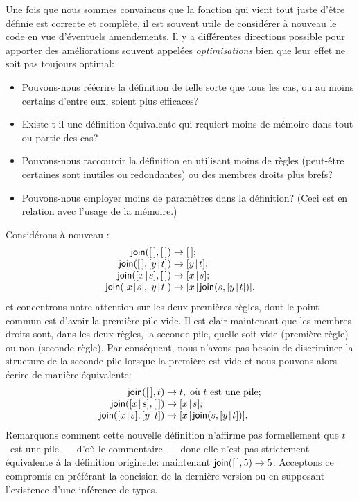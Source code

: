 Une fois que nous sommes convaincus que la fonction qui vient tout
juste d'être définie est correcte et complète, il est souvent utile de
considérer à nouveau le code en vue d'éventuels amendements. Il y a
différentes directions possible pour apporter des améliorations
souvent appelées \emph{optimisations} bien que leur effet ne soit pas
toujours optimal:
\begin{itemize}

\item Pouvons-nous réécrire la définition de telle sorte que tous les
  cas, ou au moins certains d'entre eux, soient plus efficaces?

\item Existe-t-il une définition équivalente qui requiert moins de
  mémoire dans tout ou partie des cas?

\item Pouvons-nous raccourcir la définition en utilisant moins de
  règles (peut-être certaines sont inutiles ou redondantes) ou des
  membres droits plus brefs?

\item Pouvons-nous employer moins de paramètres dans la définition?
  (Ceci est en relation avec l'usage de la mémoire.)

\end{itemize}
Considérons à nouveau :
\begin{equation*}
\begin{array}{r@{\;}l@{\;}l}
\fun{join}(\el,\el) & \rightarrow & \el;\\
\fun{join}(\el,\cons{y}{t}) & \rightarrow & \cons{y}{t};\\
\fun{join}(\cons{x}{s},\el) & \rightarrow & \cons{x}{s};\\
\fun{join}(\cons{x}{s},\cons{y}{t}) & \rightarrow & \cons{x}{\fun{join}(s,\cons{y}{t})}.
\end{array}
\end{equation*}
et concentrons notre attention sur les deux premières règles, dont le
point commun est d'avoir la première pile vide. Il est clair
maintenant que les membres droits sont, dans les deux règles, la
seconde pile, quelle soit vide (première règle) ou non (seconde
règle). Par conséquent, nous n'avons pas besoin de discriminer la
structure de la seconde pile lorsque la première est vide et nous
pouvons alors écrire de manière équivalente:
\begin{equation*}
\begin{array}{r@{\;}l@{\;}l}
\fun{join}(\el,t) & \rightarrow & t,\;\text{où \(t\) est une pile};\\
\fun{join}(\cons{x}{s},\el) & \rightarrow & \cons{x}{s};\\
\fun{join}(\cons{x}{s},\cons{y}{t}) & \rightarrow &
  \cons{x}{\fun{join}(s,\cons{y}{t})}.
\end{array}
\end{equation*}
Remarquons comment cette nouvelle définition n'affirme pas
formellement que \(t\)~est une pile ---~d'où le commentaire~--- donc
elle n'est pas strictement équivalente à la définition originelle:
maintenant \(\textsf{join}([\,],5) \rightarrow 5\). Acceptons ce compromis
en préférant la concision de la dernière version ou en supposant
l'existence d'une inférence de types.

